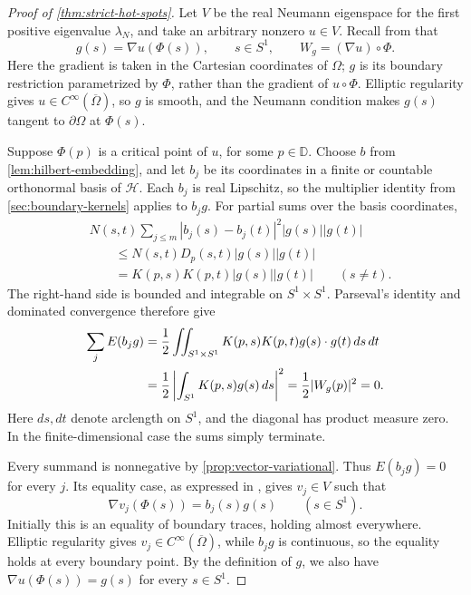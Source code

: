 \begin{proof}[Proof of \cref{thm:strict-hot-spots}]
Let $V$ be the real Neumann eigenspace for the first positive eigenvalue
$\lambda_N$, and take an arbitrary nonzero $u\in V$. Recall from
 that
\[
 g(s)=\nabla u(\Phi(s)),\qquad s\in S^1,
 \qquad W_g=(\nabla u)\circ\Phi.
\]
Here the gradient is taken in the Cartesian coordinates of $\Omega$;
$g$ is its boundary restriction parametrized by $\Phi$, rather than
the gradient of $u\circ\Phi$. Elliptic regularity
\cite[Chapter III, Theorems 6.4 and 6.5]{Showalter} gives
$u\in C^\infty(\overline\Omega)$, so $g$ is smooth, and the Neumann
condition makes $g(s)$ tangent to $\partial\Omega$ at $\Phi(s)$.

Suppose $\Phi(p)$ is a critical point of $u$, for some $p\in\mathbb D$.
Choose $b$ from \cref{lem:hilbert-embedding}, and let $b_j$ be its
coordinates in a finite or countable orthonormal basis of $\mathcal H$.
Each $b_j$ is real Lipschitz, so the multiplier identity from \cref{sec:boundary-kernels}
applies to $b_jg$. For partial sums over the basis coordinates,
\begin{align*}
 &N(s,t)\sum_{j\le m}|b_j(s)-b_j(t)|^2|g(s)||g(t)|\\
 &\qquad\le N(s,t)D_p(s,t)|g(s)||g(t)|\\
 &\qquad=K(p,s)K(p,t)|g(s)||g(t)|
 \qquad(s\ne t).
\end{align*}
The right-hand side is bounded and integrable on $S^1\times S^1$.
Parseval's identity and dominated convergence therefore give
\begin{align}
 \sum_j E(b_jg)
 &=\frac12\iint_{S^1\times S^1}
       K(p,s)K(p,t)g(s)\cdot g(t)\,ds\,dt\notag\\
 &=\frac12\left|\int_{S^1}K(p,s)g(s)\,ds\right|^2
 =\frac12|W_g(p)|^2=0.
 \label{eq:sum-multiplier-energies}
\end{align}
Here $ds,dt$ denote arclength on $S^1$, and the diagonal has product
measure zero. In the finite-dimensional case the sums simply terminate.

Every summand is nonnegative by \cref{prop:vector-variational}.
Thus $E(b_jg)=0$ for every $j$. Its equality case, as expressed in
, gives $v_j\in V$ such that
\[
 \nabla v_j(\Phi(s))=b_j(s)g(s)\qquad(s\in S^1).
\]
Initially this is an equality of boundary traces, holding almost
everywhere. Elliptic regularity gives
$v_j\in C^\infty(\overline\Omega)$, while $b_jg$ is continuous,
so the equality holds at every boundary point. By the definition of
$g$, we also have $\nabla u(\Phi(s))=g(s)$ for every $s\in S^1$.


\end{proof}
